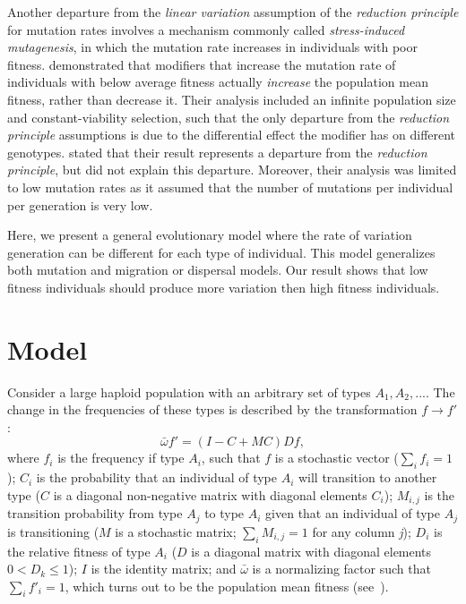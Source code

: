 \documentclass[a4paper,twocolumn]{article}   	%
\begin{document}
Another departure from the \emph{linear variation} assumption of the \emph{reduction principle} for mutation rates involves a mechanism commonly called \emph{stress-induced mutagenesis}, in which the mutation rate increases in individuals with poor fitness.
\citet{Ram2012} demonstrated that modifiers that increase the mutation rate of individuals with below average fitness actually \emph{increase} the population mean fitness, rather than decrease it.
Their analysis included an infinite population size and constant-viability selection, such that the only departure from the \emph{reduction principle} assumptions is due to the differential effect the modifier has on different genotypes. 
\citet{Ram2012} stated that their result represents a departure from the \emph{reduction principle}, but did not explain this departure.
Moreover, their analysis was limited to low mutation rates as it assumed that the number of mutations per individual per generation is very low.

Here, we present a general evolutionary model where the rate of variation generation can be different for each type of individual.
This model generalizes both mutation and migration or dispersal models. 
Our result shows that low fitness individuals should produce more variation then high fitness individuals.

\section*{Model}

Consider a large haploid population with an arbitrary set of types $A_1, A_2, ...$.
The change in the frequencies of these types is described by the transformation $f \to f'$: 
\begin{equation}\label{eq:model}
\bar{\omega} f' = (I-C+MC)D f,
\end{equation}
where $f_i$ is the frequency if type $A_i$, such that $f$ is a stochastic vector ($\sum_i{f_i} = 1$);
$C_i$ is the probability that an individual of type $A_i$ will transition to another type ($C$ is a diagonal non-negative matrix with diagonal elements $C_i$);
$M_{i,j}$ is the transition probability from type $A_j$ to type $A_i$ given that an individual of type $A_j$ is transitioning ($M$ is a stochastic matrix;
$\sum_i {M_{i,j}} = 1$ for any column \emph{j}); 
$D_i$ is the relative fitness of type $A_i$ ($D$ is a diagonal matrix with diagonal elements $0 < D_k \le 1$); 
$I$ is the identity matrix;
and $\bar{\omega}$ is a normalizing factor such that $\sum_i{f'_i}=1$, which turns out to be the population mean fitness (see~).
\end{document}
